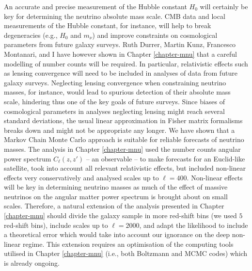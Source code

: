 An accurate and precise measurement of the Hubble constant $H_0$ will certainly be key for determining the neutrino absolute mass scale. CMB data and local measurements of the Hubble constant, for instance, will help to break degeneracies (e.g., $H_0$ and $m_\nu$) and improve constraints on cosmological parameters from future galaxy surveys.  Ruth Durrer, Martin Kunz, Francesco Montanari, and I have however shown in Chapter \ref{chapter-mnu} that a careful modelling of number counts will be required. In particular, relativistic effects such as lensing convergence will need to be included in analyses of data from future galaxy surveys. Neglecting lensing convergence when constraining neutrino masses, for instance, would lead to spurious detection of their absolute mass scale, hindering thus one of the key goals of future surveys. Since biases of cosmological parameters in analyses neglecting lensing might reach several standard deviations, the usual linear approximation in Fisher matrix formalisms breaks down and might not be appropriate any longer. We have shown that a Markov Chain Monte Carlo approach is suitable for reliable forecasts of neutrino masses. The analysis in Chapter \ref{chapter-mnu} used the number counts angular power spectrum $C_\ell(z,z')$ -- an observable -- to make forecasts for an Euclid-like satellite, took into account all relevant relativistic effects, but included non-linear effects very conservatively and analysed scales up to $\ell=400$. Non-linear effects will be key in determining neutrino masses as much of the effect of massive neutrinos on the angular matter power spectrum is brought about on small scales. Therefore, a natural extension of the analysis presented in Chapter \ref{chapter-mnu} should divide the galaxy sample in more red-shift bins (we used $5$ red-shift bins), include scales up to $\ell=2000$, and adapt the likelihood to include a theoretical error which would take into account our ignorance on the deep non-linear regime. This extension requires an optimisation of the computing tools utilised in Chapter \ref{chapter-mnu} (i.e., both Boltzmann and MCMC codes) which is already ongoing.   

